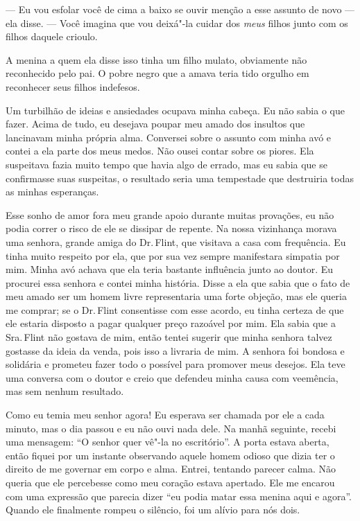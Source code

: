 --- Eu vou esfolar você de cima a baixo se ouvir menção a esse assunto
de novo --- ela disse. --- Você imagina que vou deixá"-la cuidar dos
\emph{meus} filhos junto com os filhos daquele crioulo.

A menina a quem ela disse isso tinha um filho mulato, obviamente não
reconhecido pelo pai. O pobre negro que a amava teria tido orgulho em
reconhecer seus filhos indefesos.

Um turbilhão de ideias e ansiedades
ocupava minha cabeça. Eu não sabia o que fazer. Acima de tudo, eu
desejava poupar meu amado dos insultos que lancinavam minha própria
alma. Conversei sobre o assunto com minha avó e contei a ela parte dos
meus medos. Não ousei contar sobre os piores. Ela suspeitava fazia muito
tempo que havia algo de errado, mas eu sabia que se confirmasse suas
suspeitas, o resultado seria uma tempestade que destruiria todas as
minhas esperanças.

Esse sonho de amor fora meu grande
apoio durante muitas provações, eu não podia correr o risco de ele se
dissipar de repente. Na nossa vizinhança morava uma senhora, grande
amiga do Dr.\,Flint, que visitava a casa com frequência. Eu tinha muito
respeito por ela, que por sua vez sempre manifestara simpatia por mim.
Minha avó achava que ela teria bastante influência junto ao doutor. Eu
procurei essa senhora e contei minha história. Disse a ela que sabia que
o fato de meu amado ser um homem livre representaria uma forte objeção,
mas ele queria me comprar; se o Dr.\,Flint consentisse com esse acordo,
eu tinha certeza de que ele estaria disposto a pagar qualquer preço
razoável por mim. Ela sabia que a Sra.\,Flint não gostava de mim, então
tentei sugerir que minha senhora talvez gostasse da ideia da venda, pois
isso a livraria de mim. A senhora foi bondosa e solidária e prometeu
fazer todo o possível para promover meus desejos. Ela teve uma conversa
com o doutor e creio que defendeu minha causa com veemência, mas sem
nenhum resultado.

Como eu temia meu senhor agora! Eu
esperava ser chamada por ele a cada minuto, mas o dia passou e eu não
ouvi nada dele. Na manhã seguinte, recebi uma mensagem: ``O senhor quer
vê"-la no escritório''. A porta estava aberta, então fiquei por um
instante observando aquele homem odioso que dizia ter o direito de me
governar em corpo e alma. Entrei, tentando parecer calma. Não queria que
ele percebesse como meu coração estava apertado. Ele me encarou com uma
expressão que parecia dizer ``eu podia matar essa menina aqui e agora''.
Quando ele finalmente rompeu o silêncio, foi um alívio para nós dois.

